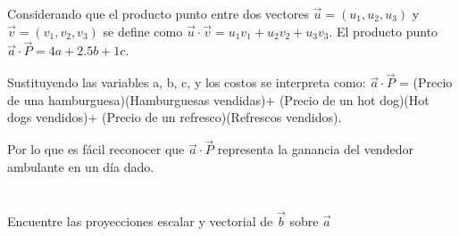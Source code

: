 \documentclass[12pt]{article}
\begin{document}
Considerando que el producto punto entre dos vectores $\vec{u} = (u_1, u_2, u_3)$ y  $\vec{v} = (v_1, v_2, v_3)$ se define como $\vec{u} \cdot \vec{v} = u_1v_1 + u_2v_2+u_3v_3$. El producto punto  $\vec{a} \cdot \vec{P} = 4a+ 2.5b+1c$.

Sustituyendo las variables a, b, c, y los costos se interpreta como:
$\vec{a} \cdot \vec{P}$ = (Precio de una hamburguesa)(Hamburguesas vendidas)+ (Precio de un hot dog)(Hot dogs vendidos)+ (Precio de un refresco)(Refrescos vendidos).

Por lo que es fácil reconocer que $\vec{a} \cdot \vec{P}$ representa la ganancia del vendedor ambulante en un día dado.


\section{}

Encuentre las proyecciones escalar y vectorial de $\vec{b}$ sobre $\vec{a}$
\end{document}
